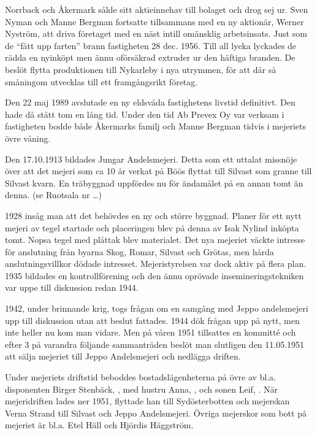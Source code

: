 Norrback och Åkermark sålde sitt aktieinnehav till bolaget och drog sej ur. Sven Nyman och Manne Bergman fortsatte tillsammans med en ny aktionär, Werner Nyström, att  driva företaget med en näst intill omänsklig arbetsinsats. Just som de ``fått upp farten'' brann fastigheten 28 dec. 1956. Till all lycka lyckades de rädda en nyinköpt men ännu oförsäkrad extruder ur den häftiga branden. De beslöt flytta produktionen till Nykarleby i nya utrymmen, för att där så småningom utvecklas till ett framgångsrikt företag.

Den 22 maj 1989 avslutade en ny eldsvåda fastighetens livstid definitivt. Den hade då stått tom en lång tid. Under den tid Ab Prevex Oy var verksam i fastigheten bodde både Åkermarks familj och Manne Bergman tidvis i mejeriets övre våning.


Den 17.10.1913 bildades Jungar Andelsmejeri. Detta som ett uttalat missnöje över att det mejeri som ca 10 år verkat på Böös flyttat till Silvast som granne till Silvast kvarn. En träbyggnad uppfördes nu för ändamålet på en annan tomt än denna. (se Ruotsala nr …)

1928 insåg man att det behövdes en ny och större byggnad. Planer för ett nytt mejeri av tegel startade och placeringen blev på denna av Isak Nylind inköpta tomt. Nopsa tegel med plåttak blev materialet. Det nya mejeriet väckte intresse för anslutning från byarna  Skog, Romar, Silvast och Grötas, men hårda anslutningsvillkor dödade intresset. Mejeristyrelsen var dock aktiv på flera plan. 1935 bildades en kontrollförening och den ännu oprövade insemineringstekniken var uppe till diskussion redan 1944.

1942, under brinnande krig, togs frågan om en samgång med Jeppo andelsmejeri upp till diskussion utan att beslut fattades. 1944 dök frågan upp på nytt, men inte heller nu kom man vidare. Men på våren 1951 tillsattes en kommitté och efter 3 på varandra följande sammanträden beslöt man slutligen den 11.05.1951 att sälja  mejeriet till Jeppo Andelsmejeri och nedlägga driften.

Under mejeriets driftstid beboddes bostadslägenheterna  på övre av bl.a. disponenten Birger Stenbäck, , med hustru Anna, , och sonen Leif, . När mejeridriften lades ner 1951, flyttade han till Sydösterbotten och mejerskan Verna Strand till Silvast och Jeppo Andelsmejeri. Övriga mejerskor som  bott på mejeriet är bl.a. Etel Häll och Hjördis Häggström.


